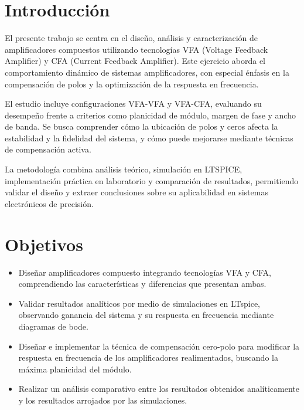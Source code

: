 \documentclass[12pt,a4paper]{article}
\begin{document}

\tableofcontents
\listoffigures
\newpage
\section{Introducción}\label{introducciuxf3n}

El presente trabajo se centra en el diseño, análisis y caracterización
de amplificadores compuestos utilizando tecnologías VFA (Voltage
Feedback Amplifier) y CFA (Current Feedback Amplifier). Este ejercicio
aborda el comportamiento dinámico de sistemas amplificadores, con
especial énfasis en la compensación de polos y la optimización de la
respuesta en frecuencia.

El estudio incluye configuraciones VFA-VFA y VFA-CFA, evaluando su
desempeño frente a criterios como planicidad de módulo, margen de fase y
ancho de banda. Se busca comprender cómo la ubicación de polos y ceros
afecta la estabilidad y la fidelidad del sistema, y cómo puede mejorarse
mediante técnicas de compensación activa.

La metodología combina análisis teórico, simulación en LTSPICE,
implementación práctica en laboratorio y comparación de resultados,
permitiendo validar el diseño y extraer conclusiones sobre su
aplicabilidad en sistemas electrónicos de precisión.

\section{Objetivos}\label{objetivos}

\begin{itemize}
\item
  Diseñar amplificadores compuesto integrando tecnologías VFA y CFA,
  comprendiendo las características y diferencias que presentan ambas.
\item
  Validar resultados analíticos por medio de simulaciones en LTspice,
  observando ganancia del sistema y su respuesta en frecuencia mediante
  diagramas de bode.
\item
  Diseñar e implementar la técnica de compensación cero-polo para
  modificar la respuesta en frecuencia de los amplificadores
  realimentados, buscando la máxima planicidad del módulo.
\item
  Realizar un análisis comparativo entre los resultados obtenidos
  analíticamente y los resultados arrojados por las simulaciones.
\end{itemize}

\newpage
\end{document}
